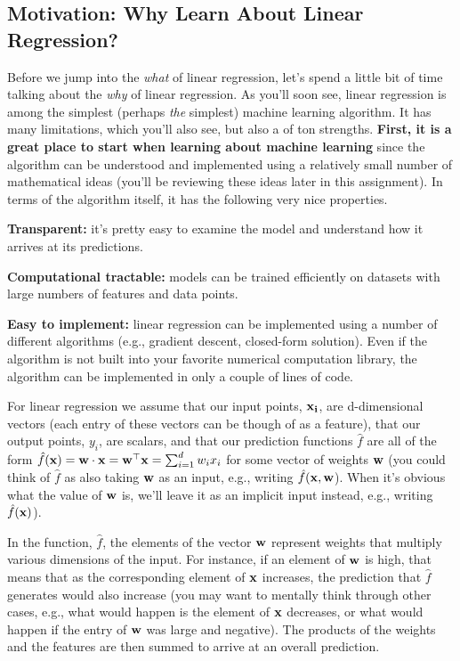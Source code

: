 \documentclass[assignment01_Solutions]{subfiles}
\begin{document}
\subsection*{Motivation: Why Learn About Linear Regression?}
Before we jump into the \emph{what} of linear regression, let's spend a little bit of time talking about the \emph{why} of linear regression.  As you'll soon see, linear regression is among the simplest (perhaps \emph{the} simplest) machine learning algorithm.  It has many limitations, which you'll also see, but also a of ton strengths.  \textbf{First, it is a great place to start when learning about machine learning} since the algorithm can be understood and implemented using a relatively small number of mathematical ideas (you'll be reviewing these ideas later in this assignment).  In terms of the algorithm itself, it has the following very nice properties.

\bi
\item \textbf{Transparent:} it's pretty easy to examine the model and understand how it arrives at its predictions.
\item \textbf{Computational tractable:} models can be trained efficiently on datasets with large numbers of features and data points.
\item \textbf{Easy to implement:} linear regression can be implemented using a number of different algorithms (e.g., gradient descent, closed-form solution).  Even if the algorithm is not built into your favorite numerical computation library, the algorithm can be implemented in only a couple of lines of code.
\ei


For linear regression we assume that our input points, $\mathbf{x_i}$, are d-dimensional vectors (each entry of these vectors can be though of as a feature), that our output points, $y_i$, are scalars, and that our prediction functions $\hat{f}$ are all of the form $\hat{f}(\mathbf{x}) =\mathbf{w} \cdot \mathbf{x} = \mathbf{w}^\top \mathbf{x} = \sum_{i=1}^d w_i x_i$ for some vector of weights $\mathbf{w}$ (you could think of $\hat{f}$ as also taking $\mathbf{w}$ as an input, e.g., writing $\hat{f}(\mathbf{x}, \mathbf{w}$).  When it's obvious what the value of $\mathbf{w}$ is, we'll leave it as an implicit input instead, e.g., writing $\hat{f}(\mathbf{x})$).

In the function, $\hat{f}$, the elements of the vector $\mathbf{w}$ represent weights that multiply various dimensions of the input.  For instance, if an element of $\mathbf{w}$ is high, that means that as the corresponding element of $\mathbf{x}$ increases, the prediction that $\hat{f}$ generates would also increase (you may want to mentally think through other cases, e.g., what would happen is the element of $\mathbf{x}$ decreases, or what would happen if the entry of $\mathbf{w}$ was large and negative).  The products of the weights and the features are then summed to arrive at an overall prediction.
\end{document}
